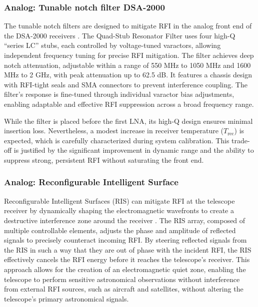 \subsubsection{Analog: Tunable notch filter DSA-2000}

The tunable notch filters are designed to mitigate RFI in the analog front end of the DSA-2000 receivers \citep{hellbourg2024assessing}. The Quad-Stub Resonator Filter uses four high-Q “series LC” stubs, each controlled by voltage-tuned varactors, allowing independent frequency tuning for precise RFI mitigation. The filter achieves deep notch attenuation, adjustable within a range of 550 MHz to 1050 MHz and 1600 MHz to 2 GHz, with peak attenuation up to 62.5 dB. It features a chassis design with RFI-tight seals and SMA connectors to prevent interference coupling. The filter's response is fine-tuned through individual varactor bias adjustments, enabling adaptable and effective RFI suppression across a broad frequency range.

While the filter is placed before the first LNA, its high-Q design ensures minimal insertion loss. Nevertheless, a modest increase in receiver temperature (\(T_{\text{rec}}\)) is expected, which is carefully characterized during system calibration. This trade-off is justified by the significant improvement in dynamic range and the ability to suppress strong, persistent RFI without saturating the front end.

\subsubsection{Analog: Reconfigurable Intelligent Surface}

Reconfigurable Intelligent Surfaces (RIS) can mitigate RFI at the telescope receiver by dynamically shaping the electromagnetic wavefronts to create a destructive interference zone around the receiver \citep{zou2022scisrs,wei2024ris,wei2023multistage}. The RIS array, composed of multiple controllable elements, adjusts the phase and amplitude of reflected signals to precisely counteract incoming RFI. By steering reflected signals from the RIS in such a way that they are out of phase with the incident RFI, the RIS effectively cancels the RFI energy before it reaches the telescope’s receiver. This approach allows for the creation of an electromagnetic quiet zone, enabling the telescope to perform sensitive astronomical observations without interference from external RFI sources, such as aircraft and satellites, without altering the telescope’s primary astronomical signals.

